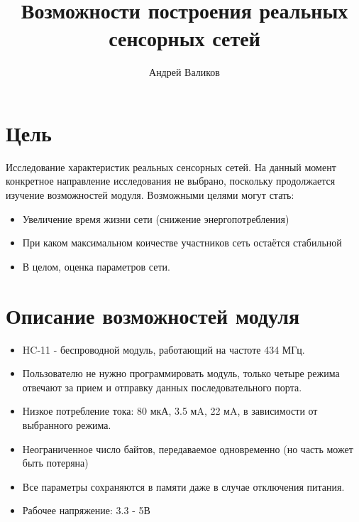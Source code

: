 \documentclass[12pt]{article}
\begin{document}
\title{Возможности построения реальных сенсорных сетей}
\author{Андрей Валиков}
\date{}
\maketitle

\section{Цель}

Исследование характеристик реальных сенсорных сетей. На данный момент конкретное направление исследования не выбрано, поскольку продолжается изучение возможностей модуля. Возможными целями могут стать:

\begin{itemize}

\item Увеличение время жизни сети (снижение энергопотребления)

\item При каком максимальном коичестве участников сеть остаётся стабильной

\item В целом, оценка параметров сети.

\end{itemize}

\section{Описание возможностей модуля}

\begin{itemize}

\item HC-11 - беспроводной модуль, работающий на частоте 434 МГц.

\item Пользователю не нужно программировать модуль, только четыре режима отвечают за прием и отправку данных последовательного порта.

\item Низкое потребление тока: 80 мкА, 3.5 мA, 22 мA, в зависимости от выбранного режима.

\item Неограниченное число байтов, передаваемое одновременно (но часть может быть потеряна)


\item Все параметры сохраняются в памяти даже в случае отключения питания.


\item Рабочее напряжение: 3.3 - 5В

\end{itemize}
\end{document}
